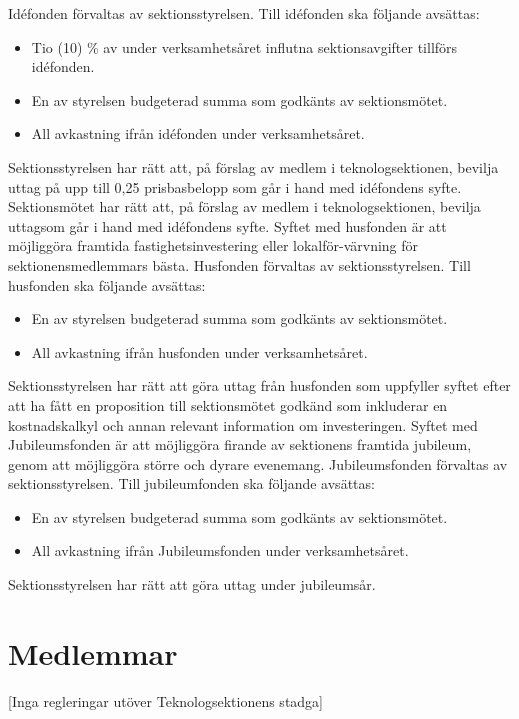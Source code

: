 \documentclass[a4paper]{dteklag}
\begin{document}
\para Idéfonden förvaltas av sektionsstyrelsen.
\para Till idéfonden ska följande avsättas:
\begin{itemize}
\item Tio (10) \% av under verksamhetsåret influtna sektionsavgifter tillförs idéfonden.
\item En av styrelsen budgeterad summa som godkänts av sektionsmötet.
\item All avkastning ifrån idéfonden under verksamhetsåret.
\end{itemize}
\para Sektionsstyrelsen har rätt att, på förslag av medlem i teknologsektionen, bevilja uttag på upp till 0,25 prisbasbelopp som går i hand med idéfondens syfte.
\para Sektionsmötet har rätt att, på förslag av medlem i teknologsektionen, bevilja uttagsom går i hand med idéfondens syfte.
\para[Husfonden] Syftet med husfonden är att möjliggöra framtida fastighetsinvestering eller lokalför-värvning för sektionensmedlemmars bästa.
\para Husfonden förvaltas av sektionsstyrelsen.
\para Till husfonden ska följande avsättas:
\begin{itemize}
  \item En av styrelsen budgeterad summa som godkänts av sektionsmötet.
  \item All avkastning ifrån husfonden under verksamhetsåret.
\end{itemize}
\para Sektionsstyrelsen har rätt att göra uttag från husfonden som uppfyller syftet efter att ha fått en proposition till sektionsmötet godkänd som inkluderar en kostnadskalkyl och annan relevant information om investeringen.
\para[Jubileumsfonden] Syftet med Jubileumsfonden är att möjliggöra firande av sektionens framtida jubileum, genom att möjliggöra större och dyrare evenemang.
\para Jubileumsfonden förvaltas av sektionsstyrelsen.
\para Till jubileumfonden ska följande avsättas:
\begin{itemize}
  \item En av styrelsen budgeterad summa som godkänts av sektionsmötet.
  \item All avkastning ifrån Jubileumsfonden under verksamhetsåret.
\end{itemize}
\para Sektionsstyrelsen har rätt att göra uttag under jubileumsår.
\section{Medlemmar}
\begin{center}
  [Inga regleringar utöver Teknologsektionens stadga]
\end{center}
\end{document}
